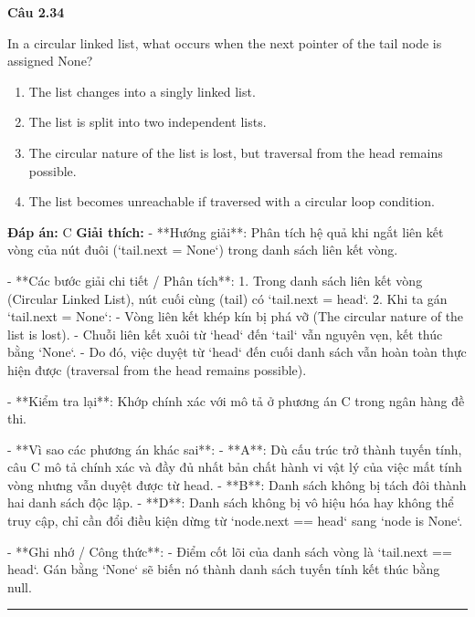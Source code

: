 \documentclass[11pt,a4paper]{article}
\newenvironment{question}[1]{%
  \par\vspace{1em}\noindent\textbf{\large Câu #1}\par\vspace{0.4em}
}{%
  \par\vspace{1em}\hrule\vspace{0.6em}
}
\newenvironment{choices}{%
  \begin{enumerate}[label=\textbf{\Alph*.},leftmargin=2.2em,itemsep=2pt,topsep=3pt]
}{%
  \end{enumerate}
}
\newcommand{\choice}{\item}
\begin{document}
\begin{question}{2.34}
In a circular linked list, what occurs when the next pointer of the tail node is assigned None?
\begin{choices}
\choice The list changes into a singly linked list.
\choice The list is split into two independent lists.
\choice The circular nature of the list is lost, but traversal from the head remains possible.
\choice The list becomes unreachable if traversed with a circular loop condition.
\end{choices}
\textbf{Đáp án:} C
\textbf{Giải thích:} - **Hướng giải**:
  Phân tích hệ quả khi ngắt liên kết vòng của nút đuôi (`tail.next = None`) trong danh sách liên kết vòng.

- **Các bước giải chi tiết / Phân tích**:
  1. Trong danh sách liên kết vòng (Circular Linked List), nút cuối cùng (tail) có `tail.next = head`.
  2. Khi ta gán `tail.next = None`:
     - Vòng liên kết khép kín bị phá vỡ (The circular nature of the list is lost).
     - Chuỗi liên kết xuôi từ `head` đến `tail` vẫn nguyên vẹn, kết thúc bằng `None`.
     - Do đó, việc duyệt từ `head` đến cuối danh sách vẫn hoàn toàn thực hiện được (traversal from the head remains possible).

- **Kiểm tra lại**:
  Khớp chính xác với mô tả ở phương án C trong ngân hàng đề thi.

- **Vì sao các phương án khác sai**:
  - **A**: Dù cấu trúc trở thành tuyến tính, câu C mô tả chính xác và đầy đủ nhất bản chất hành vi vật lý của việc mất tính vòng nhưng vẫn duyệt được từ head.
  - **B**: Danh sách không bị tách đôi thành hai danh sách độc lập.
  - **D**: Danh sách không bị vô hiệu hóa hay không thể truy cập, chỉ cần đổi điều kiện dừng từ `node.next == head` sang `node is None`.

- **Ghi nhớ / Công thức**:
  - Điểm cốt lõi của danh sách vòng là `tail.next == head`. Gán bằng `None` sẽ biến nó thành danh sách tuyến tính kết thúc bằng null.
\end{question}
\end{document}
